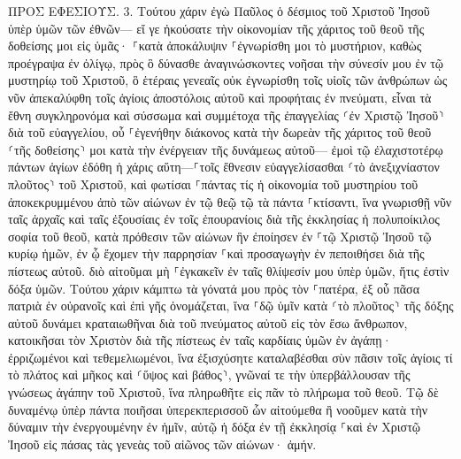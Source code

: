 \documentclass[twoside, 9pt]{extreport}
\begin{document}
ΠΡΟΣ ΕΦΕΣΙΟΥΣ.
3.
Τούτου χάριν ἐγὼ Παῦλος ὁ δέσμιος τοῦ Χριστοῦ Ἰησοῦ ὑπὲρ ὑμῶν τῶν ἐθνῶν— 
εἴ γε ἠκούσατε τὴν οἰκονομίαν τῆς χάριτος τοῦ θεοῦ τῆς δοθείσης μοι εἰς ὑμᾶς· 
⸀κατὰ ἀποκάλυψιν ⸀ἐγνωρίσθη μοι τὸ μυστήριον, καθὼς προέγραψα ἐν ὀλίγῳ, 
πρὸς ὃ δύνασθε ἀναγινώσκοντες νοῆσαι τὴν σύνεσίν μου ἐν τῷ μυστηρίῳ τοῦ Χριστοῦ, 
ὃ ἑτέραις γενεαῖς οὐκ ἐγνωρίσθη τοῖς υἱοῖς τῶν ἀνθρώπων ὡς νῦν ἀπεκαλύφθη τοῖς ἁγίοις ἀποστόλοις αὐτοῦ καὶ προφήταις ἐν πνεύματι, 
εἶναι τὰ ἔθνη συγκληρονόμα καὶ σύσσωμα καὶ συμμέτοχα τῆς ἐπαγγελίας ⸂ἐν Χριστῷ Ἰησοῦ⸃ διὰ τοῦ εὐαγγελίου, 
οὗ ⸀ἐγενήθην διάκονος κατὰ τὴν δωρεὰν τῆς χάριτος τοῦ θεοῦ ⸂τῆς δοθείσης⸃ μοι κατὰ τὴν ἐνέργειαν τῆς δυνάμεως αὐτοῦ— 
ἐμοὶ τῷ ἐλαχιστοτέρῳ πάντων ἁγίων ἐδόθη ἡ χάρις αὕτη—⸀τοῖς ἔθνεσιν εὐαγγελίσασθαι ⸂τὸ ἀνεξιχνίαστον πλοῦτος⸃ τοῦ Χριστοῦ, 
καὶ φωτίσαι ⸀πάντας τίς ἡ οἰκονομία τοῦ μυστηρίου τοῦ ἀποκεκρυμμένου ἀπὸ τῶν αἰώνων ἐν τῷ θεῷ τῷ τὰ πάντα ⸀κτίσαντι, 
ἵνα γνωρισθῇ νῦν ταῖς ἀρχαῖς καὶ ταῖς ἐξουσίαις ἐν τοῖς ἐπουρανίοις διὰ τῆς ἐκκλησίας ἡ πολυποίκιλος σοφία τοῦ θεοῦ, 
κατὰ πρόθεσιν τῶν αἰώνων ἣν ἐποίησεν ἐν ⸀τῷ Χριστῷ Ἰησοῦ τῷ κυρίῳ ἡμῶν, 
ἐν ᾧ ἔχομεν τὴν παρρησίαν ⸀καὶ προσαγωγὴν ἐν πεποιθήσει διὰ τῆς πίστεως αὐτοῦ. 
διὸ αἰτοῦμαι μὴ ⸀ἐγκακεῖν ἐν ταῖς θλίψεσίν μου ὑπὲρ ὑμῶν, ἥτις ἐστὶν δόξα ὑμῶν. 
Τούτου χάριν κάμπτω τὰ γόνατά μου πρὸς τὸν ⸀πατέρα, 
ἐξ οὗ πᾶσα πατριὰ ἐν οὐρανοῖς καὶ ἐπὶ γῆς ὀνομάζεται, 
ἵνα ⸀δῷ ὑμῖν κατὰ ⸂τὸ πλοῦτος⸃ τῆς δόξης αὐτοῦ δυνάμει κραταιωθῆναι διὰ τοῦ πνεύματος αὐτοῦ εἰς τὸν ἔσω ἄνθρωπον, 
κατοικῆσαι τὸν Χριστὸν διὰ τῆς πίστεως ἐν ταῖς καρδίαις ὑμῶν ἐν ἀγάπῃ· ἐρριζωμένοι καὶ τεθεμελιωμένοι, 
ἵνα ἐξισχύσητε καταλαβέσθαι σὺν πᾶσιν τοῖς ἁγίοις τί τὸ πλάτος καὶ μῆκος καὶ ⸂ὕψος καὶ βάθος⸃, 
γνῶναί τε τὴν ὑπερβάλλουσαν τῆς γνώσεως ἀγάπην τοῦ Χριστοῦ, ἵνα πληρωθῆτε εἰς πᾶν τὸ πλήρωμα τοῦ θεοῦ. 
Τῷ δὲ δυναμένῳ ὑπὲρ πάντα ποιῆσαι ὑπερεκπερισσοῦ ὧν αἰτούμεθα ἢ νοοῦμεν κατὰ τὴν δύναμιν τὴν ἐνεργουμένην ἐν ἡμῖν, 
αὐτῷ ἡ δόξα ἐν τῇ ἐκκλησίᾳ ⸀καὶ ἐν Χριστῷ Ἰησοῦ εἰς πάσας τὰς γενεὰς τοῦ αἰῶνος τῶν αἰώνων· ἀμήν. 
\end{document}
